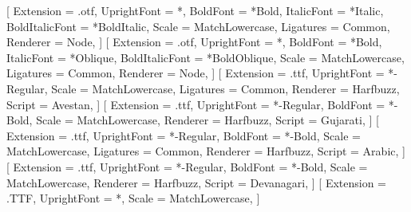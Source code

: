 %
[%
   Extension      = .otf,%
   UprightFont    = *,%
   BoldFont       = *Bold,%
   ItalicFont     = *Italic,%
   BoldItalicFont = *BoldItalic,%
   Scale          = MatchLowercase,%
   Ligatures      = {Common},%
   Renderer       = Node,%
]%
%
[%
   Extension      = .otf,%
   UprightFont    = *,%
   BoldFont       = *Bold,%
   ItalicFont     = *Oblique,%
   BoldItalicFont = *BoldOblique,%
   Scale          = MatchLowercase,%
   Ligatures      = {Common},%
   Renderer       = Node,%
]%
%
[%
   Extension      = .ttf,%
   UprightFont    = *-Regular,%
   Scale          = MatchLowercase,%
   Ligatures      = {Common},%
   Renderer       = Harfbuzz,%
   Script         = Avestan,%
]%
%
[%
   Extension      = .ttf,%
   UprightFont    = *-Regular,%
   BoldFont       = *-Bold,%
   Scale          = MatchLowercase,%
   Renderer       = Harfbuzz,%
   Script         = Gujarati,%
]%
%
[%
   Extension      = .ttf,%
   UprightFont    = *-Regular,%
   BoldFont       = *-Bold,%
   Scale          = MatchLowercase,%
   Ligatures      = {Common},%
   Renderer       = Harfbuzz,%
   Script         = Arabic,%
]%
%
[%
   Extension      = .ttf,%
   UprightFont    = *-Regular,%
   BoldFont       = *-Bold,%
   Scale          = MatchLowercase,%
   Renderer       = Harfbuzz,%
   Script         = Devanagari,%
]%
%
[%
   Extension      = .TTF,%
   UprightFont    = *,%
   Scale          = MatchLowercase,%
]%
\newcommand{\textarabic}[1]{\bgroup\microtypesetup{activate=false}\textdir TRT\arabicfont #1\egroup}
\newcommand{\textavestan}[1]{\bgroup\microtypesetup{activate=false}\textdir TRT\avestanfont #1\egroup}
\newcommand{\textgujarati}[1]{\bgroup\microtypesetup{activate=false}\gujaratifont #1\egroup}
\newcommand{\textpahlavi}[1]{\bgroup\microtypesetup{activate=false}\textdir TRT\pahlavifont #1\egroup}
\newcommand{\textsanskrit}[1]{\bgroup\microtypesetup{activate=false}\sanskritfont #1\egroup}

\newcommand*{\aee}{ǝ̄}
\newcommand*{\XVE}{x\realsuperscript{v}}%
\newcommand*{\NGVE}{ŋ\realsuperscript{v}}%


